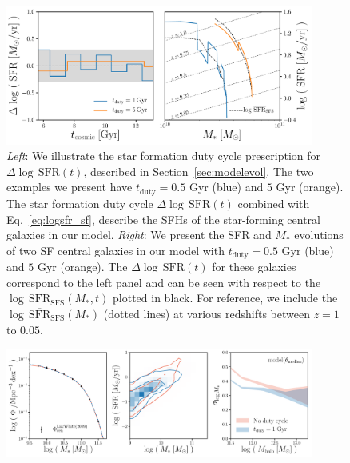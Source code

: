 \documentclass[12pt, letterpaper, preprint]{aastex}
\newcommand{\logsfr}{\log \, \mathrm{SFR}}
\newcommand{\musfms}{\log\,\overline{\mathrm{SFR}}_\mathrm{SFS}}
\begin{document}
\begin{figure}
\begin{center}
\includegraphics[width=0.9\textwidth]{figs/sfh_pedagogical.pdf}
    \caption{\emph{Left}: We illustrate the star formation duty 
    cycle prescription for $\Delta \logsfr(t)$, described 
    in Section~\ref{sec:modelevol}. The two examples we present have
    $t_\mathrm{duty} = 0.5$ Gyr (blue) and $5$ Gyr (orange). The star 
    formation duty cycle $\Delta \logsfr(t)$ combined with Eq.~\ref{eq:logsfr_sf}, 
    describe the SFHs of the star-forming central galaxies in our model. 
    \emph{Right}: We present the SFR and $M_*$ evolutions of two SF central 
    galaxies in our model with $t_\mathrm{duty} = 0.5$ Gyr (blue) and $5$ 
    Gyr (orange). The $\Delta \logsfr(t)$ for these galaxies correspond 
    to the left panel and can be seen with respect to the $\musfms(M_*, t)$ 
    plotted in black. For reference, we include the $\musfms(M_*)$ (dotted 
    lines) at various redshifts between $z = 1$ to $0.05$.} \label{fig:sfh_model}
\end{center}
\end{figure}


\begin{figure}
\begin{center}
\includegraphics[width=0.9\textwidth]{figs/qaplot_abc.pdf}
\caption{}
\label{fig:abc_demo}
\end{center}
\end{figure}
\end{document}
